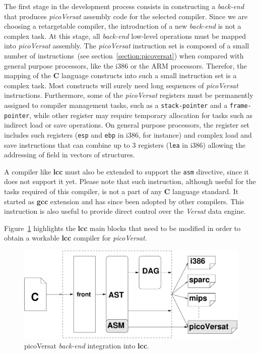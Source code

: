 \documentclass[journal]{IEEEtran}
\begin{document}
The first stage in the development process consists in constructing a {\it back-end}
that produces {\it picoVersat} assembly code for the selected compiler.  Since
we are choosing a retargetable compiler, the introduction of a new {\it back-end} is
not a complex task.  At this stage, all {\it back-end} low-level operations must be
mapped into {\it picoVersat} assembly.  The {\it picoVersat} instruction set is
composed of a small number of instructions~(see
section~\ref{section:picoversat}) when compared with general purpose processors,
like the {\sc i386} or the {\sc ARM} processors.  Therefor, the mapping of the
{\bf C} language constructs into such a small instruction set is a complex task.
Most constructs will surely need long sequences of {\it picoVersat}
instructions.  Furthermore, some of the {\it picoVersat} registers must be
permanently assigned to compiler management tasks, such as a {\tt stack-pointer}
and a {\tt frame-pointer}, while other register may require temporary allocation
for tasks such as indirect load or save operations.  On general purpose
processors, the register set includes such registers ({\tt esp} and {\tt ebp} in
{\sc i386}, for instance) and complex load and save instructions that can
combine up to 3 registers ({\tt lea} in {\sc i386}) allowing the addressing of
field in vectors of structures.

A compiler like {\bf lcc} must also be extended to support the {\tt asm}
directive, since it does not support it yet.  Please note that such instruction,
although useful for the tasks required of this compiler, is not a part of any
{\bf C} language standard.  It started as {\bf gcc} extension and has since been
adopted by other compilers. This instruction is also useful to provide direct
control over the {\it Versat} data engine.

Figure~\ref{fig:lccPico} highlights the {\bf lcc} main blocks that need to be
modified in order to obtain a workable {\bf lcc} compiler for {\it picoVersat}.


\begin{figure}[!h]
\centering \includegraphics[width=0.80\columnwidth]{lccPico.pdf}
\caption{picoVersat {\it back-end} integration into {\bf lcc}.}
\label{fig:lccPico}
\end{figure}
\end{document}
